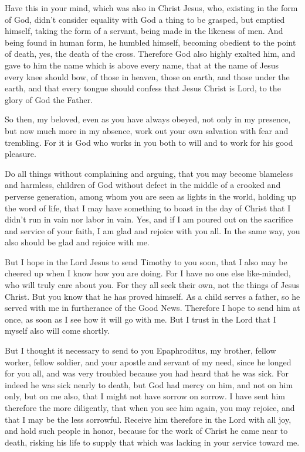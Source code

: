  Have this in your mind, which was also in Christ Jesus,
 who, existing in the form of God, didn't consider
equality with God a thing to be grasped,  but emptied
himself, taking the form of a servant, being made in the likeness of
men.  And being found in human form, he humbled himself,
becoming obedient to the point of death, yes, the death of the cross.
 Therefore God also highly exalted him, and gave to him
the name which is above every name,  that at the name of
Jesus every knee should bow, of those in heaven, those on earth, and
those under the earth,  and that every tongue should
confess that Jesus Christ is Lord, to the glory of God the Father.

 So then, my beloved, even as you have always obeyed, not
only in my presence, but now much more in my absence, work out your own
salvation with fear and trembling.  For it is God who
works in you both to will and to work for his good pleasure.

 Do all things without complaining and arguing,
 that you may become blameless and harmless, children of
God without defect in the middle of a crooked and perverse generation,
among whom you are seen as lights in the world,  holding
up the word of life, that I may have something to boast in the day of
Christ that I didn't run in vain nor labor in vain.  Yes,
and if I am poured out on the sacrifice and service of your faith, I am
glad and rejoice with you all.  In the same way, you also
should be glad and rejoice with me.

 But I hope in the Lord Jesus to send Timothy to you
soon, that I also may be cheered up when I know how you are doing.
 For I have no one else like-minded, who will truly care
about you.  For they all seek their own, not the things
of Jesus Christ.  But you know that he has proved
himself. As a child serves a father, so he served with me in furtherance
of the Good News.  Therefore I hope to send him at once,
as soon as I see how it will go with me.  But I trust in
the Lord that I myself also will come shortly.

 But I thought it necessary to send to you Epaphroditus,
my brother, fellow worker, fellow soldier, and your apostle and servant
of my need,  since he longed for you all, and was very
troubled because you had heard that he was sick.  For
indeed he was sick nearly to death, but God had mercy on him, and not on
him only, but on me also, that I might not have sorrow on sorrow.
 I have sent him therefore the more diligently, that when
you see him again, you may rejoice, and that I may be the less
sorrowful.  Receive him therefore in the Lord with all
joy, and hold such people in honor,  because for the work
of Christ he came near to death, risking his life to supply that which
was lacking in your service toward me.

